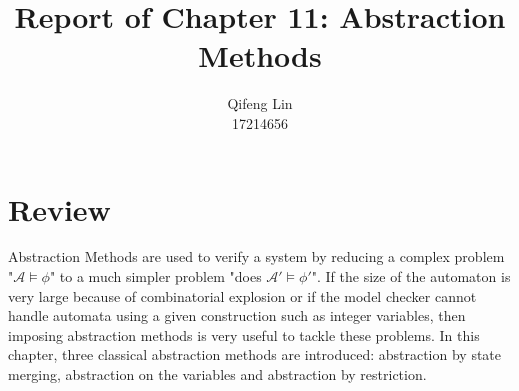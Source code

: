 \documentclass{acmtog} %
\begin{document}

\title{Report of Chapter 11: Abstraction Methods } %

\author{Qifeng Lin \\ 17214656}


\maketitle

\section{Review}
    \quad Abstraction Methods are used to verify a system by reducing a complex problem "$\mathcal{A}\models\phi$" to a much simpler problem "does $\mathcal{A}'\models\phi'$". If the size of the automaton is very large because of combinatorial explosion or if the model checker cannot handle automata using a given construction such as integer variables, then imposing abstraction methods is very useful to tackle these problems. In this chapter, three classical abstraction methods are introduced: abstraction by state merging, abstraction on the variables and abstraction by restriction.
\end{document}
